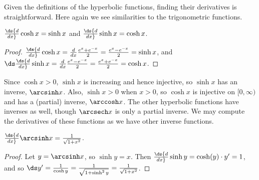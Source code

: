 
Given the definitions of the hyperbolic functions, finding their
derivatives is straightforward. Here again we see similarities to the
trigonometric functions.

\begin{theorem} $\ds{d\over dx}\cosh x=\sinh x$ and 
\label{thm:hyperbolic derivatives}
$\ds{d\over dx}\sinh x = \cosh x$.
\end{theorem}

\begin{proof}
$\ds{d\over dx}\cosh x= {d\over dx}{e^x +e^{-x}\over 2} = 
{e^x- e^{-x}\over 2} =\sinh x$, and 
$\ds\ds{d\over dx}\sinh x = {d\over dx}{e^x -e^{-x}\over 2} = 
{e^x +e^{-x }\over 2} =\cosh x$.
\end{proof}

Since $\cosh x > 0$, $\sinh x$ is increasing and hence injective, so
$\sinh x$ has an inverse, $\arcsinh x$. Also, $\sinh x > 0$ when
$x>0$, so $\cosh x$ is injective on $[0,\infty)$ and has a (partial)
inverse, $\arccosh x$. The other hyperbolic functions have inverses
as well, though $\arcsech x$ is only a partial inverse. 
We may compute the derivatives of these functions as we have other
inverse functions.

\begin{theorem} $\ds{d\over dx}\arcsinh x = {1\over\sqrt{1+x^2}}$.
\end{theorem}
\begin{proof}
Let $y=\arcsinh x$, so $\sinh y=x$. Then 
$\ds{d\over dx}\sinh y = \cosh(y)\cdot y'  = 1$, and
so $\ds y' ={1\over\cosh y} ={1\over\sqrt{1 +\sinh^2 y}} =
{1\over\sqrt{1+x^2}}$.
\end{proof}

